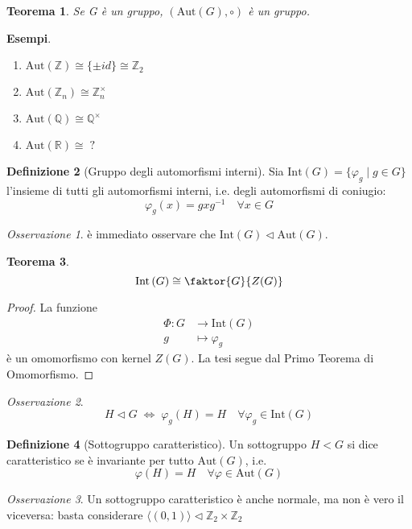 \documentclass[a4paper]{article}
\newtheorem{theorem}{Teorema}[section]
\theoremstyle{remark}
\newtheorem*{remark}{Osservazione}
\theoremstyle{definition}
\newtheorem{definition}[theorem]{Definizione}
\newcommand{\Aut}[1]{\mathrm{Aut}\left( #1 \right)}
\newcommand{\Int}[1]{\mathrm{Int}\left( #1 \right)}
\newcommand{\fun}[5]{\begin{align*}
	#1 \colon #2 &\to #3 \\
	#4 &\mapsto #5
	\end{align*}}
\begin{document}
\begin{multicols}{2}
\begin{theorem}
	Se G è un gruppo, $ \left(\Aut{G}, \circ\right) $ è un gruppo.
\end{theorem}

\textbf{Esempi}.
\begin{enumerate}
	\item $ \Aut{\mathbb{Z}} \cong \{\pm id\} \cong \mathbb{Z}_2 $
	\item $ \Aut{\mathbb{Z}_n} \cong \mathbb{Z}_n^\times $
	\item $ \Aut{\mathbb{Q}} \cong \mathbb{Q}^\times $
	\item $ \Aut{\mathbb{R}} \cong \; ? $
\end{enumerate} 

\begin{definition}[Gruppo degli automorfismi interni]
	Sia $ \Int{G} = \{ \varphi_g \mid g \in G \} $ l'insieme di tutti gli automorfismi interni, i.e. degli automorfismi di coniugio: \[ \varphi_g(x) = gxg^{-1} \quad\forall x \in G \]
\end{definition}
\begin{remark}
	è immediato osservare che $ \Int{G} \lhd \Aut{G} $.
\end{remark}
\begin{theorem}
	\[ \Int{G} \cong \faktor{G}{Z(G)} \]
\end{theorem}
\begin{proof}
	La funzione \fun{\Phi}{G}{\Int{G}}{g}{\varphi_g} è un omomorfismo con kernel $ Z(G) $. La tesi segue dal Primo Teorema di Omomorfismo.
\end{proof}

\begin{remark}
	\[ H \lhd G \;\Leftrightarrow\; \varphi_g\left(H\right) = H \quad \forall \varphi_g \in \Int{G} \]
\end{remark}

\begin{definition}[Sottogruppo caratteristico]
	Un sottogruppo $ H < G $ si dice caratteristico se è invariante per tutto $ \Aut{G} $, i.e. $$ \varphi\left(H\right) = H \quad \forall \varphi \in \Aut{G} $$
\end{definition}
\begin{remark}
	Un sottogruppo caratteristico è anche normale, ma non è vero il viceversa: basta considerare $ \langle (0, 1) \rangle \lhd \mathbb{Z}_2 \times \mathbb{Z}_2 $
\end{remark}


\end{multicols}
\end{document}
